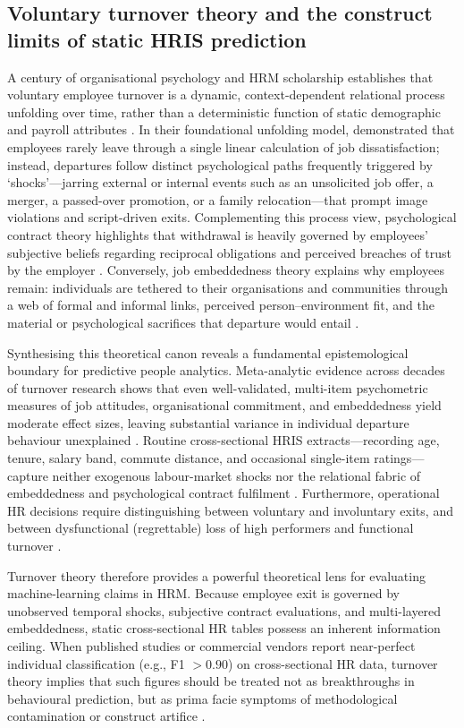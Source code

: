\documentclass[12pt,a4paper]{article}
\begin{document}
\subsection{Voluntary turnover theory and the construct limits of static HRIS prediction}
\label{sec:turnover-theory}
A century of organisational psychology and HRM scholarship establishes that voluntary employee turnover is a dynamic, context-dependent relational process unfolding over time, rather than a deterministic function of static demographic and payroll attributes \parencite{ref36,ref62}. In their foundational unfolding model, \textcite{ref46} demonstrated that employees rarely leave through a single linear calculation of job dissatisfaction; instead, departures follow distinct psychological paths frequently triggered by `shocks'---jarring external or internal events such as an unsolicited job offer, a merger, a passed-over promotion, or a family relocation---that prompt image violations and script-driven exits. Complementing this process view, psychological contract theory highlights that withdrawal is heavily governed by employees' subjective beliefs regarding reciprocal obligations and perceived breaches of trust by the employer \parencite{ref47}. Conversely, job embeddedness theory explains why employees remain: individuals are tethered to their organisations and communities through a web of formal and informal links, perceived person--environment fit, and the material or psychological sacrifices that departure would entail \parencite{ref48}.

Synthesising this theoretical canon reveals a fundamental epistemological boundary for predictive people analytics. Meta-analytic evidence across decades of turnover research shows that even well-validated, multi-item psychometric measures of job attitudes, organisational commitment, and embeddedness yield moderate effect sizes, leaving substantial variance in individual departure behaviour unexplained \parencite{ref36,ref62}. Routine cross-sectional HRIS extracts---recording age, tenure, salary band, commute distance, and occasional single-item ratings---capture neither exogenous labour-market shocks \parencite{ref46} nor the relational fabric of embeddedness and psychological contract fulfilment \parencite{ref47,ref48}. Furthermore, operational HR decisions require distinguishing between voluntary and involuntary exits, and between dysfunctional (regrettable) loss of high performers and functional turnover \parencite{ref20,ref36}.

Turnover theory therefore provides a powerful theoretical lens for evaluating machine-learning claims in HRM. Because employee exit is governed by unobserved temporal shocks, subjective contract evaluations, and multi-layered embeddedness, static cross-sectional HR tables possess an inherent information ceiling. When published studies or commercial vendors report near-perfect individual classification (e.g., F1 $> 0.90$) on cross-sectional HR data, turnover theory implies that such figures should be treated not as breakthroughs in behavioural prediction, but as prima facie symptoms of methodological contamination or construct artifice \parencite{ref36,ref45,ref64}.
\end{document}
